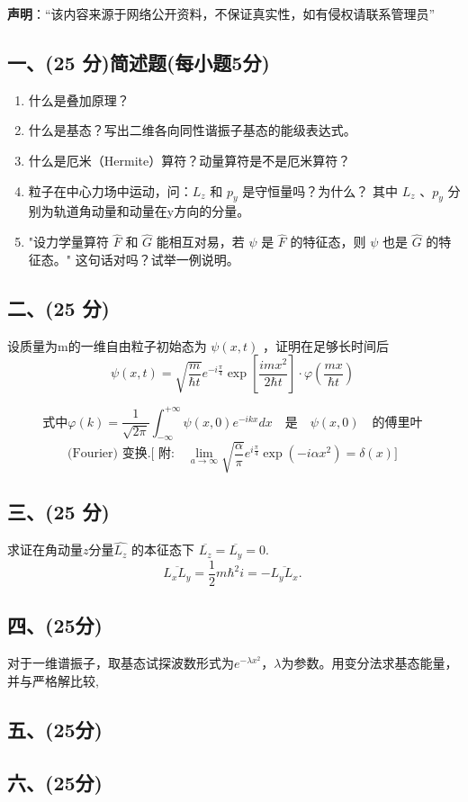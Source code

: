 
\textbf{声明}：“该内容来源于网络公开资料，不保证真实性，如有侵权请联系管理员”

\subsection{一、(25 分)简述题(每小题5分)}
\begin{enumerate}
        \item 什么是叠加原理？
        \item 什么是基态？写出二维各向同性谐振子基态的能级表达式。
        \item 什么是厄米（Hermite）算符？动量算符是不是厄米算符？
        \item 粒子在中心力场中运动，问：$L_z$ 和 $p_y$ 是守恒量吗？为什么？
        其中 $L_z$ 、$p_y$ 分别为轨道角动量和动量在y方向的分量。
        \item "设力学量算符 $\hat{F}$ 和 $\hat{G}$ 能相互对易，若 $\psi$ 是 $\hat{F}$ 的特征态，则 $\psi$ 也是 $\hat{G}$ 的特征态。" 这句话对吗？试举一例说明。
    \end{enumerate}
\subsection{二、(25 分)}
设质量为m的一维自由粒子初始态为 $\psi(x,t)$ ，证明在足够长时间后
$$\psi(x,t) = \sqrt{\frac{m}{\hbar t}} e^{-i\frac{\pi}{4}} \exp \left[ \frac{imx^2}{2\hbar t} \right] \cdot \varphi \left( \frac{mx}{\hbar t} \right)~$$

$$\text{式中}\varphi(k) = \frac{1}{\sqrt{2\pi}} \int_{-\infty}^{+\infty} \psi(x, 0) e^{-ikx} dx \quad \text{是} \quad \psi(x, 0) \quad \text{的傅里叶}~$$
$$\text{(Fourier) 变换.[ 附:} \quad \lim_{a \to \infty} \sqrt{\frac{\alpha}{\pi}} e^{i \frac{\pi}{4}} \exp(-i \alpha x^2) = \delta(x)]~$$
\subsection{三、(25 分)}
求证在角动量$z$分量$\hat{L_z}$ 的本征态下 $\overline{L_z} = \overline{L_y} = 0.$
$$\overline{L_x L_y} = \frac{1}{2} m \hbar^2 i = - \overline{L_y L_x}.~$$
\subsection{四、(25分)}
对于一维谱振子，取基态试探波数形式为$e^{-\lambda x^2}$，$\lambda$为参数。用变分法求基态能量，并与严格解比较,
\subsection{五、(25分)}

\subsection{六、(25分)}